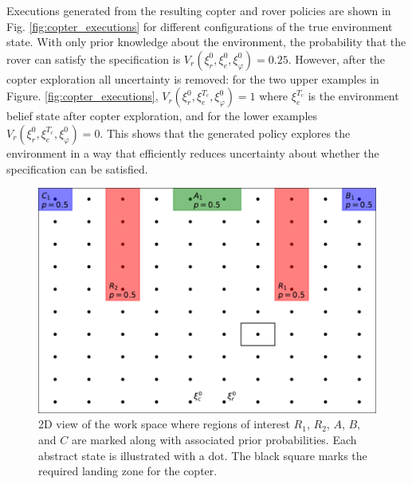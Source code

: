 \documentclass[conference]{IEEEtran}
\begin{document}
Executions generated from the resulting copter and rover policies are shown in Fig. \ref{fig:copter_executions} for different configurations of the true environment state. With only prior knowledge about the environment, the probability that the rover can satisfy the specification is $V_r(\xi_r^0, \xi_e^0, \xi_\varphi^0) = 0.25$. However, after the copter exploration all uncertainty is removed: for the two upper examples in Figure. \ref{fig:copter_executions}, $V_r(\xi_r^0, \xi_e^{T_{c}}, \xi_\varphi^0) = 1$ where $\xi_e^{T_c}$ is the environment belief state after copter exploration, and for the lower examples $V_r(\xi_r^0, \xi_e^{T_{c}}, \xi_\varphi^0) = 0$. This shows that the generated policy explores the environment in a way that efficiently reduces uncertainty about whether the specification can be satisfied.

\begin{figure}
  \begin{center}
    \includegraphics[width=0.6\columnwidth]{2figs/arena.pdf}
  \end{center}
  \caption{2D view of the work space where regions of interest $R_1$, $R_2$, $A$, $B$, and $C$ are marked along with associated prior probabilities. Each abstract state is illustrated with a dot. The black square marks the required landing zone for the copter.}
  \label{fig:workspace1}
\end{figure}

\end{document}
